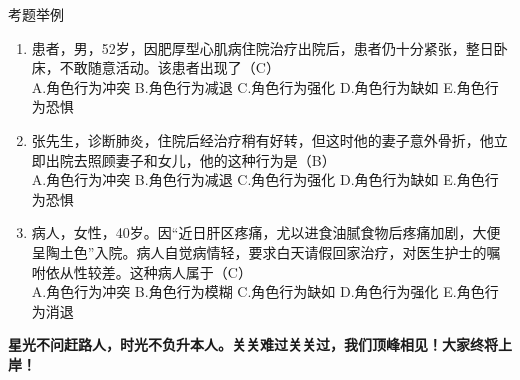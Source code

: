 \documentclass[11pt, a4paper]{ctexart}
\begin{document}
\begin{examplebox}{考题举例}
\begin{enumerate}
    \item 患者，男，52岁，因肥厚型心肌病住院治疗出院后，患者仍十分紧张，整日卧床，不敢随意活动。该患者出现了（C）\\
    A.角色行为冲突 \quad B.角色行为减退 \quad C.角色行为强化 \quad D.角色行为缺如 \quad E.角色行为恐惧
    \item 张先生，诊断肺炎，住院后经治疗稍有好转，但这时他的妻子意外骨折，他立即出院去照顾妻子和女儿，他的这种行为是（B）\\
    A.角色行为冲突 \quad B.角色行为减退 \quad C.角色行为强化 \quad D.角色行为缺如 \quad E.角色行为恐惧
    \item 病人，女性，40岁。因“近日肝区疼痛，尤以进食油腻食物后疼痛加剧，大便呈陶土色”入院。病人自觉病情轻，要求白天请假回家治疗，对医生护士的嘱咐依从性较差。这种病人属于（C）\\
    A.角色行为冲突 \quad B.角色行为模糊 \quad C.角色行为缺如 \quad D.角色行为强化 \quad E.角色行为消退
\end{enumerate}
\end{examplebox}

\begin{center}
    \Huge \bfseries 星光不问赶路人，时光不负升本人。关关难过关关过，我们顶峰相见！\textbf{大家终将上岸！}
\end{center}
\end{document}

